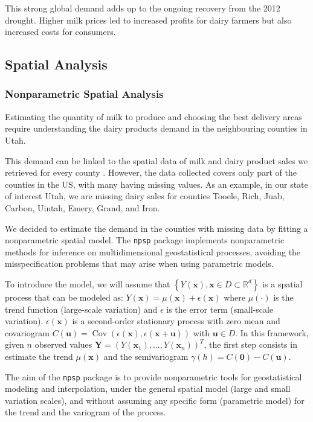 This strong global demand adds up to the ongoing recovery from the 2012 drought. Higher milk prices led to increased profits for dairy farmers but also increased costs for consumers.

\subsection{Spatial Analysis}
\subsubsection{Nonparametric Spatial Analysis}
Estimating the quantity of milk to produce and choosing the best delivery areas require understanding the dairy products demand in the neighbouring counties in Utah.

This demand can be linked to the spatial data of milk and dairy product sales we retrieved for every county \cite{spatial_data}.
However, the  data collected covers only part of the counties in the US, with many having missing values.
As an example, in our state of interest Utah, we are missing dairy sales for counties Tooele, Rich, Juab, Carbon, Uintah, Emery, Grand, and Iron.


We decided to estimate the demand in the counties with missing data by fitting a nonparametric spatial model.
The \texttt{npsp} package \cite{npsp} implements nonparametric methods for inference on multidimensional geostatistical processes, avoiding the misspecification problems that may arise when using parametric models.

To introduce the model, we will assume that $\left\{Y(\mathbf{x}), \mathbf{x} \in D \subset \mathbb{R}^d\right\}$ is a spatial process that can be modeled as: $Y(\mathbf{x})=\mu(\mathbf{x})+\epsilon(\mathbf{x})$ where $\mu(\cdot)$ is the trend function (large-scale variation) and $\epsilon$ is the error term  (small-scale variation). $\epsilon(\mathbf{x})$ is a second-order stationary process with zero mean and covariogram $C(\mathbf{u})=\operatorname{Cov}(\epsilon(\mathbf{x}), \epsilon(\mathbf{x}+\mathbf{u}))$ with $\mathbf{u} \in D$. 
In this framework, given $n$ observed values $\mathbf{Y}=(Y(\mathbf{x}_1),\ldots,Y(\mathbf{x}_n))^T$, the first step consists in estimate the trend $\mu(\mathbf{x})$ and the semivariogram $\gamma(h)= C(\mathbf{0}) - C(\mathbf{u})$.

The aim of the \texttt{npsp} package is to provide nonparametric tools for geostatistical modeling and interpolation, under the general spatial model (large and small variation scales), and without assuming any specific form (parametric model) for the trend and the variogram of the process.


